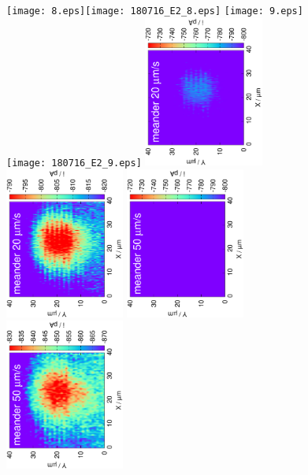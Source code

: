 \documentclass[a4paper, 11pt]{article}
\begin{document}
\thispagestyle{empty}


\thispagestyle{empty}
\begin{figure}
\centering
\texttt{[image: 8.eps]}\texttt{[image: 180716\_E2\_8.eps]}
\texttt{[image: 9.eps]}\texttt{[image: 180716\_E2\_9.eps]}
\includegraphics[width=0.35\textwidth, angle=-90]{10.eps}\includegraphics[width=0.35\textwidth, angle=-90]{180716_E2_10.eps}
\includegraphics[width=0.35\textwidth, angle=-90]{11.eps}\includegraphics[width=0.35\textwidth, angle=-90]{180716_E2_11.eps}


\end{figure}
\end{document}
